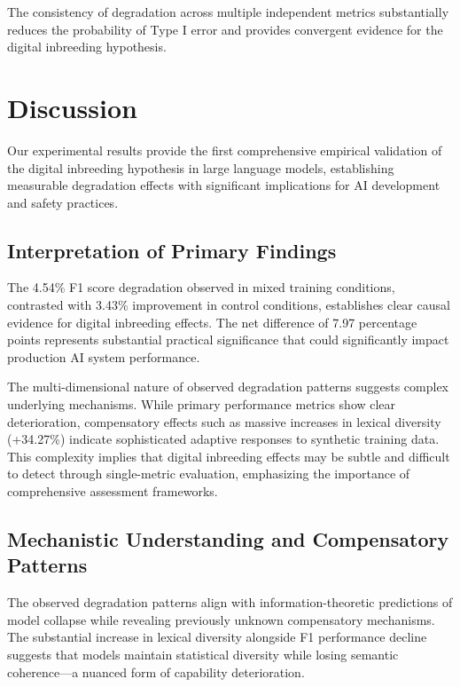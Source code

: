 \documentclass[11pt]{article}
\begin{document}
The consistency of degradation across multiple independent metrics substantially reduces the probability of Type I error and provides convergent evidence for the digital inbreeding hypothesis.

\section{Discussion}

Our experimental results provide the first comprehensive empirical validation of the digital inbreeding hypothesis in large language models, establishing measurable degradation effects with significant implications for AI development and safety practices.

\subsection{Interpretation of Primary Findings}

The 4.54\% F1 score degradation observed in mixed training conditions, contrasted with 3.43\% improvement in control conditions, establishes clear causal evidence for digital inbreeding effects. The net difference of 7.97 percentage points represents substantial practical significance that could significantly impact production AI system performance.

The multi-dimensional nature of observed degradation patterns suggests complex underlying mechanisms. While primary performance metrics show clear deterioration, compensatory effects such as massive increases in lexical diversity (+34.27\%) indicate sophisticated adaptive responses to synthetic training data. This complexity implies that digital inbreeding effects may be subtle and difficult to detect through single-metric evaluation, emphasizing the importance of comprehensive assessment frameworks.

\subsection{Mechanistic Understanding and Compensatory Patterns}

The observed degradation patterns align with information-theoretic predictions of model collapse while revealing previously unknown compensatory mechanisms. The substantial increase in lexical diversity alongside F1 performance decline suggests that models maintain statistical diversity while losing semantic coherence—a nuanced form of capability deterioration.
\end{document}
